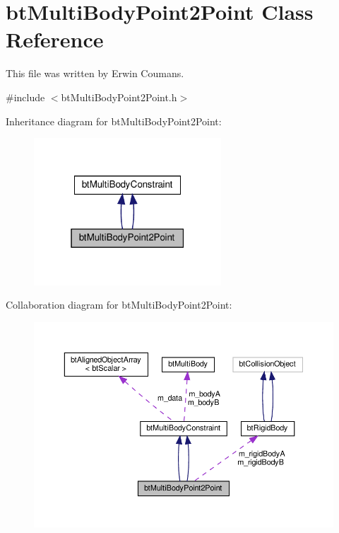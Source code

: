 \hypertarget{classbtMultiBodyPoint2Point}{}\section{bt\+Multi\+Body\+Point2\+Point Class Reference}
\label{classbtMultiBodyPoint2Point}


This file was written by Erwin Coumans.  




{\ttfamily \#include $<$bt\+Multi\+Body\+Point2\+Point.\+h$>$}



Inheritance diagram for bt\+Multi\+Body\+Point2\+Point\+:
\nopagebreak
\begin{figure}[H]
\begin{center}
\leavevmode
\includegraphics[width=199pt]{classbtMultiBodyPoint2Point__inherit__graph}
\end{center}
\end{figure}


Collaboration diagram for bt\+Multi\+Body\+Point2\+Point\+:
\nopagebreak
\begin{figure}[H]
\begin{center}
\leavevmode
\includegraphics[width=350pt]{classbtMultiBodyPoint2Point__coll__graph}
\end{center}
\end{figure}
